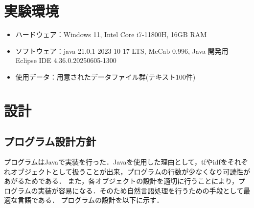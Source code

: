 \documentclass[a4paper,11pt]{ltjsarticle}
\begin{document}
\section{実験環境}
\begin{itemize}
    \item ハードウェア：Windows 11, Intel Core i7-11800H, 16GB RAM
    \item ソフトウェア：java 21.0.1 2023-10-17 LTS, MeCab 0.996, Java 開発用 Eclipse IDE	4.36.0.20250605-1300
    \item 使用データ：用意されたデータファイル群(テキスト100件)
\end{itemize}

\section{設計}
\subsection{プログラム設計方針}
プログラムはJavaで実装を行った．Javaを使用した理由として，tfやidfをそれぞれオブジェクトとして扱うことが出来，プログラムの行数が少なくなり可読性があがるためである．
また，各オブジェクトの設計を適切に行うことにより，プログラムの実装が容易になる．そのため自然言語処理を行うための手段として最適な言語である．
プログラムの設計を以下に示す．
\end{document}
